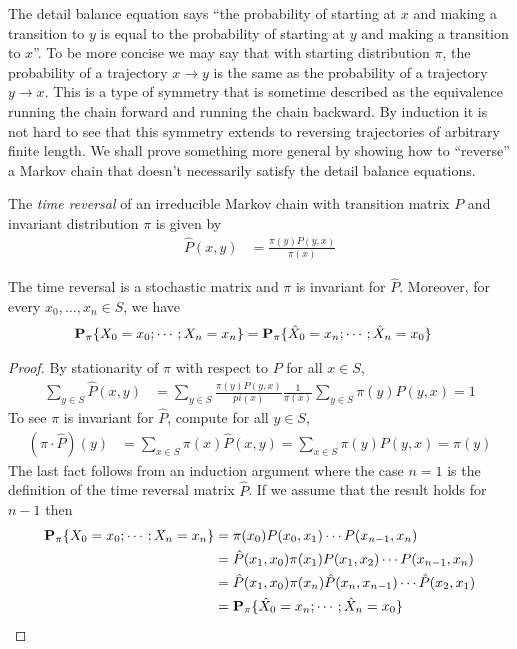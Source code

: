 The detail balance equation says ``the probability of starting at $x$
and making a transition to $y$ is equal to the probability of starting
at $y$ and making a transition to $x$''.  To be more concise we may
say that with starting distribution $\pi$, the probability of a trajectory $x \to y$ is the same as the
probability of a trajectory $y \to x$.  This is a type of symmetry
that is sometime described as the equivalence running the chain
forward and running the chain backward.  By induction it is not hard
to see that this symmetry extends to reversing trajectories of
arbitrary finite length.  We shall prove something more general by
showing how to ``reverse'' a Markov chain that doesn't necessarily
satisfy the detail balance equations.

\begin{defn}The \emph{time reversal} of an irreducible Markov chain
  with transition matrix $P$ and invariant distribution $\pi$ is
  given by 
\begin{align*}
\hat{P}(x,y) &= \frac{\pi(y) P(y,x)}{\pi(x)}
\end{align*}
\end{defn}

\begin{lem}The time reversal is a stochastic matrix and $\pi$ is
  invariant for $\hat{P}$.  Moreover, for every $x_0, \dotsc, x_n \in
  S$, we have
\begin{align*}
\textbf{P}_{\pi}\{X_0 = x_0; \dotsb ; X_n = x_n\} &=
\textbf{P}_{\pi}\{\hat{X}_0 = x_n ; \dotsb ; \hat{X}_n = x_0\}
\end{align*}
\end{lem}
\begin{proof}
By stationarity of $\pi$ with respect to $P$ for all $x \in S$,
\begin{align*}
\sum_{y \in S} \hat{P}(x,y) &=\sum_{y \in S} \frac{\pi(y)
  P(y,x)}{pi(x)} \frac{1}{\pi(x)} \sum_{y \in S} \pi(y)  P(y,x) = 1
\end{align*}
To see $\pi$ is invariant for $\hat{P}$, compute for all $y \in S$,
\begin{align*}
(\pi \cdot \hat{P})(y) &= \sum_{x \in S} \pi(x) \hat{P}(x,y) = \sum_{x
  \in S} \pi(y) P(y,x) =\pi(y)
\end{align*}
The last fact follows from an induction argument where the case $n=1$
is the definition of the time reversal matrix $\hat{P}$.  If we assume
that the result holds for $n-1$ then
\begin{align*}
\textbf{P}_{\pi}\{X_0 = x_0; \dotsb ; X_n = x_n\}  &= \pi(x_0) P(x_0,
x_1) \dotsb P(x_{n-1}, x_n) \\
&= \hat{P}(x_1, x_0) \pi(x_1) P(x_1, x_2) \dotsb P(x_{n-1},x_n) \\
&= \hat{P}(x_1, x_0) \pi(x_n) \hat{P}(x_n, x_{n-1}) \dotsb \hat{P}
(x_2,x_1) \\
&= \textbf{P}_{\pi}\{\hat{X}_0 = x_n ; \dotsb ; \hat{X}_n = x_0\}
\end{align*}
\end{proof}

